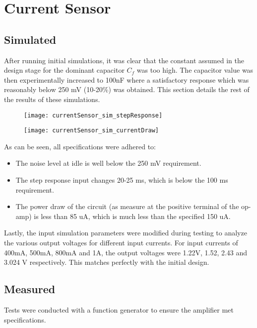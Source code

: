 \graphicspath{{content/3_results/figures}}
\section{Current Sensor}

\subsection{Simulated}

After running initial simulations, it was clear that the constant assumed in the design stage for the dominant capacitor $C_f$ was too high. The capacitor value was then experimentally
increased to 100nF where a satisfactory response which was reasonably below 250 mV (10-20\%) was obtained. This section details the rest of the results of these simulations.

\begin{figure}[h!]
   \centering
   \texttt{[image: currentSensor\_sim\_stepResponse]}
   \label{fig:simulation response}
\end{figure}

\begin{figure}[h!]
   \centering
   \texttt{[image: currentSensor\_sim\_currentDraw]}
   \label{fig:simulation_current}
\end{figure}

As can be seen, all specifications were adhered to:
\begin{itemize}
   \item The noise level at idle is well below the 250 mV requirement.
   \item The step response input changes 20-25 ms, which is below the 100 ms requirement.
   \item The power draw of the circuit (as measure at the positive terminal of the op-amp) is less than 85 uA, which is much less than the specified 150 uA.
\end{itemize}

Lastly, the input simulation parameters were modified during testing to analyze the various output voltages for different input currents. For input currents of 400mA, 500mA, 800mA and 1A,
the output voltages were 1.22V, 1.52, 2.43 and 3.024 V respectively. This matches perfectly with the initial design.

\subsection{Measured}
Tests were conducted with a function generator to ensure the amplifier met specifications.

